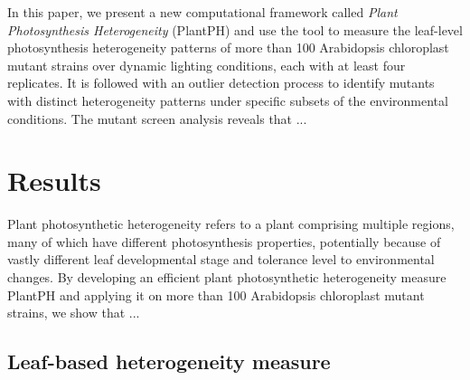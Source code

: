 {%


In this paper, we present a new computational framework called {\it Plant Photosynthesis Heterogeneity} (PlantPH) and use the tool to measure the leaf-level photosynthesis heterogeneity patterns of more than 100 Arabidopsis chloroplast mutant strains over dynamic lighting conditions, each with at least four replicates. It is followed with an outlier detection process to identify mutants with distinct heterogeneity patterns under specific subsets of the environmental conditions.
%
The mutant screen analysis reveals that ...




\section*{Results}

Plant photosynthetic heterogeneity refers to a plant comprising multiple regions, many of which have different photosynthesis properties, potentially because of vastly different leaf developmental stage and tolerance level to environmental changes. By developing an efficient plant photosynthetic heterogeneity measure PlantPH and applying it on more than 100 Arabidopsis chloroplast mutant strains, we show that ...

\subsection*{Leaf-based heterogeneity measure} \label{sec:PlantPH}

%


%
%
%

}
